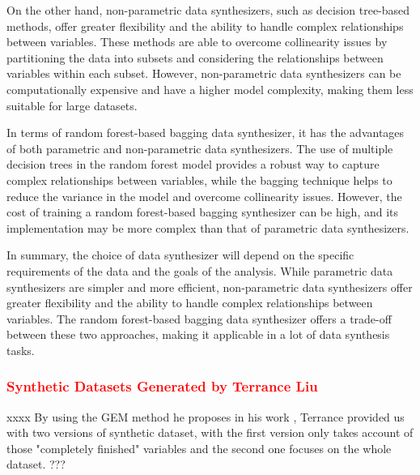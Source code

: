 On the other hand, non-parametric data synthesizers, such as decision tree-based methods, offer greater flexibility and the ability to handle complex relationships between variables. These methods are able to overcome collinearity issues by partitioning the data into subsets and considering the relationships between variables within each subset. However, non-parametric data synthesizers can be computationally expensive and have a higher model complexity, making them less suitable for large datasets.

In terms of random forest-based bagging data synthesizer, it has the advantages of both parametric and non-parametric data synthesizers. The use of multiple decision trees in the random forest model provides a robust way to capture complex relationships between variables, while the bagging technique helps to reduce the variance in the model and overcome collinearity issues. However, the cost of training a random forest-based bagging synthesizer can be high, and its implementation may be more complex than that of parametric data synthesizers.

In summary, the choice of data synthesizer will depend on the specific requirements of the data and the goals of the analysis. While parametric data synthesizers are simpler and more efficient, non-parametric data synthesizers offer greater flexibility and the ability to handle complex relationships between variables. The random forest-based bagging data synthesizer offers a trade-off between these two approaches, making it applicable in a lot of data synthesis tasks.


\subsubsection{\textcolor{red}{Synthetic Datasets Generated by Terrance Liu}}
\label{subsubsec:terrance}
xxxx
By using the GEM method he proposes in his work \citep{liu2021iterative}, Terrance provided us with two versions of synthetic dataset, with the first version only takes account of those "completely finished" variables and the second one focuses on the whole dataset. ???



